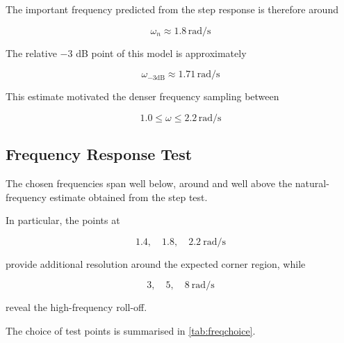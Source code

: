 \documentclass[12pt,a4paper]{article}
\begin{document}
The important frequency predicted from the step response is
therefore around

\begin{equation}
    \omega_n
    \approx \mathbf{1.8}\,\mathrm{rad/s}
    \tag{21}
\end{equation}

The relative $-3$ dB point of this model is approximately

\begin{equation}
    \omega_{-3\mathrm{dB}}
    \approx \mathbf{1.71}\,\mathrm{rad/s}
    \tag{22}
\end{equation}

This estimate motivated the denser frequency sampling between

\begin{equation}
    \mathbf{1.0}
    \leq \omega \leq
    \mathbf{2.2}\,\mathrm{rad/s}
    \tag{23}
\end{equation}

\newpage

\subsection{Frequency Response Test}

The chosen frequencies span well below, around and well above the
natural-frequency estimate obtained from the step test.

In particular, the points at

\[
1.4,\quad 1.8,\quad 2.2~\mathrm{rad/s}
\]

provide additional resolution around the expected corner region,
while

\[
3,\quad 5,\quad 8~\mathrm{rad/s}
\]

reveal the high-frequency roll-off.

The choice of test points is summarised in
\cref{tab:freqchoice}.
\end{document}
